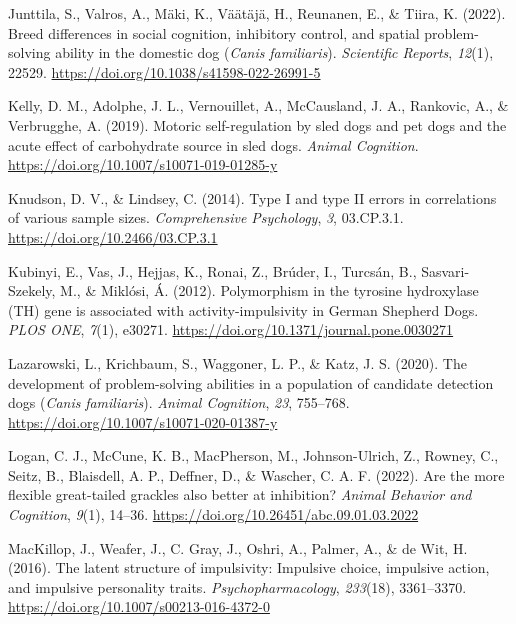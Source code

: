 \documentclass[
  ,pub,floatsintext]{apa6}
\newlength{\cslhangindent}
\newlength{\cslentryspacingunit} %
\newenvironment{CSLReferences}[2] %
 {%
  \setlength{\parindent}{0pt}
  \ifodd #1
  \let\oldpar\par
  \def\par{\hangindent=\cslhangindent\oldpar}
  \fi
  \setlength{\parskip}{#2\cslentryspacingunit}
 }%
 {}
\begin{document}
\begin{CSLReferences}{1}{0}
\leavevmode{}%
Junttila, S., Valros, A., Mäki, K., Väätäjä, H., Reunanen, E., \& Tiira, K. (2022). Breed differences in social cognition, inhibitory control, and spatial problem-solving ability in the domestic dog ({\emph{Canis}}{ \emph{familiaris}}). \emph{Scientific Reports}, \emph{12}(1), 22529. \url{https://doi.org/10.1038/s41598-022-26991-5}

\leavevmode{}%
Kelly, D. M., Adolphe, J. L., Vernouillet, A., McCausland, J. A., Rankovic, A., \& Verbrugghe, A. (2019). Motoric self-regulation by sled dogs and pet dogs and the acute effect of carbohydrate source in sled dogs. \emph{Animal Cognition}. \url{https://doi.org/10.1007/s10071-019-01285-y}

\leavevmode{}%
Knudson, D. V., \& Lindsey, C. (2014). Type {I} and type {II} errors in correlations of various sample sizes. \emph{Comprehensive Psychology}, \emph{3}, 03.CP.3.1. \url{https://doi.org/10.2466/03.CP.3.1}

\leavevmode{}%
Kubinyi, E., Vas, J., Hejjas, K., Ronai, Z., Brúder, I., Turcsán, B., Sasvari-Szekely, M., \& Miklósi, Á. (2012). Polymorphism in the tyrosine hydroxylase ({TH}) gene is associated with activity-impulsivity in {German Shepherd Dogs}. \emph{PLOS ONE}, \emph{7}(1), e30271. \url{https://doi.org/10.1371/journal.pone.0030271}

\leavevmode{}%
Lazarowski, L., Krichbaum, S., Waggoner, L. P., \& Katz, J. S. (2020). The development of problem-solving abilities in a population of candidate detection dogs ({\emph{Canis}}{ \emph{familiaris}}). \emph{Animal Cognition}, \emph{23}, 755--768. \url{https://doi.org/10.1007/s10071-020-01387-y}

\leavevmode{}%
Logan, C. J., McCune, K. B., MacPherson, M., Johnson-Ulrich, Z., Rowney, C., Seitz, B., Blaisdell, A. P., Deffner, D., \& Wascher, C. A. F. (2022). Are the more flexible great-tailed grackles also better at inhibition? \emph{Animal Behavior and Cognition}, \emph{9}(1), 14--36. \url{https://doi.org/10.26451/abc.09.01.03.2022}

\leavevmode{}%
MacKillop, J., Weafer, J., C. Gray, J., Oshri, A., Palmer, A., \& de Wit, H. (2016). The latent structure of impulsivity: Impulsive choice, impulsive action, and impulsive personality traits. \emph{Psychopharmacology}, \emph{233}(18), 3361--3370. \url{https://doi.org/10.1007/s00213-016-4372-0}


\end{CSLReferences}
\end{document}
